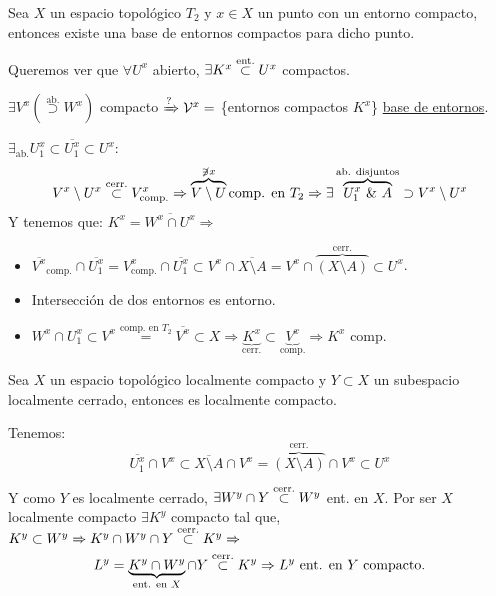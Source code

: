 \begin{prop}
Sea $X$ un espacio topológico $T_2$ y $x \in X$ un punto con un entorno compacto, entonces existe una base de entornos compactos para dicho punto.
\end{prop}
\begin{demo}
    Queremos ver que $\forall U^x$ abierto, $\exists K^x \stackrel{\text{ent.}}{\subset} U^x$ compactos.

    $\exists V^x (\stackrel{\text{ab.}}{\supset} W^x)$ compacto $\xRightarrow{?} \mathcal{V}^x =$ \{entornos compactos $K^x$\} \underline{base de entornos}.

    $\exists_{\text{ab.}} U_1^x \subset \overline{U_1^x} \subset U^x$:
    \[ 
        V^x\setminus U^x \stackrel{\text{cerr.}}{\subset} V_{\text{comp.}}^x \Rightarrow \overbrace{V \setminus U}^{\not\ni x} \text{comp. en } T_2 \Rightarrow \exists \overbrace{U_1^x\ \&\ A}^{\text{ab. disjuntos}} \supset V^x \setminus U^x
    \]
    Y tenemos que: $K^x = \overline{W^x \cap U^x} \Rightarrow$
    \begin{itemize}
        \item $\overline{V^x}_{\text{comp.}} \cap \overline{U_1^x} = V^x_{\text{comp.}} \cap \overline{U_1^x} \subset V^x \cap \overline{X \setminus A} = V^x \cap \overbrace{\left( X \setminus A \right)}^{\text{cerr.}} \subset U^x$.
        \item Intersección de dos entornos es entorno.
        \item $W^x \cap U_1^x \subset V^x \stackrel{\text{comp. en } T_2}{=} \overline{V^x} \subset X \Rightarrow \underbrace{K^x}_{\text{cerr.}} \subset \underbrace{V^x}_{\text{comp.}} \Rightarrow K^x \text{ comp.}$
    \end{itemize}
\end{demo}

\begin{prop}[Mantra 1]
Sea $X$ un espacio topológico localmente compacto y $Y\subset X$ un subespacio localmente cerrado, entonces es localmente compacto.
\end{prop}
\begin{demo}
    Tenemos:
    \[
    \overline{U_1^x} \cap V^x \subset \overline{X \setminus A} \cap V^x = \overbrace{\left( X \setminus A \right)}^{\text{cerr.}} \cap V^x \subset U^x
    \]

    Y como $Y$ es localmente cerrado, $\exists W^y \cap Y \stackrel{\text{cerr.}}{\subset} W^y$ ent. en $X$. Por ser $X$ localmente compacto $\exists K^y$ compacto tal que, $K^y \subset W^y \Rightarrow K^y \cap W^y \cap Y \stackrel{\text{cerr.}}{\subset} K^y \Rightarrow$
    \[
    L^y = \underbrace{K^y \cap W^y}_{\text{ent. en } X} \cap Y \stackrel{\text{cerr.}}{\subset} K^y \Rightarrow L^y \text{ ent. en } Y \text{ compacto.}  
    \]
\end{demo}

